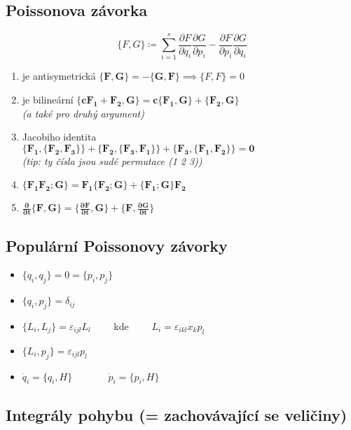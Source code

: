 \documentclass[a5paper,12pt]{article}
\begin{document}
\subsection{Poissonova závorka}

\begin{equation*}
	\{F, G\} \coloneqq \sum_{i=1}^s \frac{\partial F}{\partial q_i}\frac{\partial G}{\partial p_i} - \frac{\partial F}{\partial p_i}\frac{\partial G}{\partial q_i}
\end{equation*}

\begin{enumerate}
	\item je antisymetrická $\boldsymbol{\{F, G\} = - \{G, F\}} \implies \{F, F\} = 0$
	\item je bilineární $\boldsymbol{\{cF_1 + F_2, G\} = c\{F_1, G\} + \{F_2, G\}}$\\ 
		\textit{(a také pro druhý argument)}
	\item Jacobiho identita\\ 
		$\boldsymbol{\{F_1, \{F_2, F_3\}\} + \{F_2, \{F_3, F_1\}\} + \{F_3, \{F_1, F_2\}\} = 0}$\\ 
		\textit{(tip: ty čísla jsou sudé permutace (1 2 3))}
	\item $\boldsymbol{\{F_1 F_2; G\} = F_1\{F_2; G\} + \{F_1; G\}F_2}$
	\item $\boldsymbol{\frac{\partial}{\partial t} \{F, G\} = \{\frac{\partial F}{\partial t}, G\} + \{F, \frac{\partial G}{\partial t}\}}$
\end{enumerate}

\subsection{Populární Poissonovy závorky}

\begin{itemize}
	\item $\{q_i, q_j\} = 0 = \{p_i, p_j\}$
	\item $\{q_i, p_j\} = \delta_{ij}$
	\item $\{L_i, L_j\} = \varepsilon_{ijl}L_l \qquad$ kde $\qquad L_i = \varepsilon_{ikl}x_k p_l$
	\item $\{L_i, p_j\} = \varepsilon_{ijl}p_l$
	\item $\dot{q}_i = \{q_i, H\}$ $\quad\qquad$ $\dot{p}_i = \{p_i, H\}$
\end{itemize}

\subsection{Integrály pohybu (= zachovávající se veličiny)}
\end{document}
